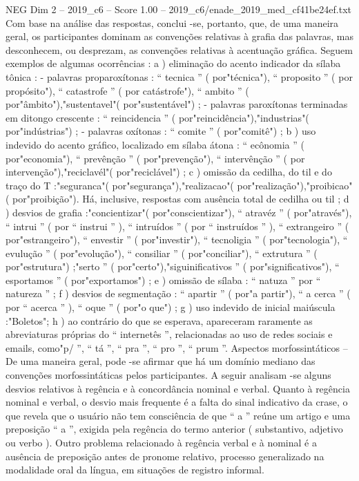\begin{textsample}{NEG Dim 2 – 2019\_c6 – Score 1.00 – 2019\_c6/enade\_2019\_med\_cf41be24ef.txt}
Com base na análise das respostas, conclui -se, portanto, que, de uma maneira geral, os participantes dominam as convenções relativas à grafia das palavras, mas desconhecem, ou desprezam, as convenções relativas à acentuação gráfica.
Seguem exemplos de algumas ocorrências : a ) eliminação do acento indicador da sílaba tônica : - palavras proparoxítonas : “ tecnica ” ( por"técnica"), “ proposito ” ( por propósito"), “ catastrofe ” ( por catástrofe"), “ ambito ” ( por"âmbito"),"sustentavel"( por"sustentável") ; - palavras paroxítonas terminadas em ditongo crescente : “ reincidencia ” ( por"reincidência"),"industrias"( por"indústrias") ; - palavras oxítonas : “ comite ” ( por"comitê") ; b ) uso indevido do acento gráfico, localizado em sílaba átona : “ ecônomia ” ( por"economia"), “ prevênção ” ( por"prevenção"), “ intervênção ” ( por intervenção"),"reciclavél"( por"reciclável") ; c ) omissão da cedilha, do til e do traço do T :"seguranca"( por"segurança"),"realizacao"( por"realização"),"proibicao"( por"proibição").
Há, inclusive, respostas com ausência total de cedilha ou til ; d ) desvios de grafia :"concientizar"( por"conscientizar"), “ atravéz ” ( por"através"), “ intrui ” ( por “ instrui ” ), “ intruídos ” ( por “ instruídos ” ), “ extrangeiro ” ( por"estrangeiro"), “ envestir ” ( por"investir"), “ tecnoligia ” ( por"tecnologia"), “ evulução ” ( por"evolução"), “ consiliar ” ( por"conciliar"), “ extrutura ” ( por"estrutura") ;"serto ” ( por"certo"),"siguinificativos ” ( por"significativos"), “ esportamos ” ( por"exportamos") ; e ) omissão de sílaba : “ natuza ” por “ natureza ” ; f ) desvios de segmentação : “ apartir ” ( por"a partir"), “ a cerca ” ( por “ acerca ” ), “ oque ” ( por"o que") ; g ) uso indevido de inicial maiúscula :"Boletos"; h ) ao contrário do que se esperava, apareceram raramente as abreviaturas próprias do “ internetês ”, relacionadas ao uso de redes sociais e emails, como"p/ ”, “ tá ”, “ pra ”, “ pro ”, “ prum ”.
Aspectos morfossintáticos – De uma maneira geral, pode -se afirmar que há um domínio mediano das convenções morfossintáticas pelos participantes.
A seguir analisam -se alguns desvios relativos à regência e à concordância nominal e verbal.
Quanto à regência nominal e verbal, o desvio mais frequente é a falta do sinal indicativo da crase, o que revela que o usuário não tem consciência de que “ a ” reúne um artigo e uma preposição “ a ”, exigida pela regência do termo anterior ( substantivo, adjetivo ou verbo ).
Outro problema relacionado à regência verbal e à nominal é a ausência de preposição antes de pronome relativo, processo generalizado na modalidade oral da língua, em situações de registro informal.

\end{textsample}
